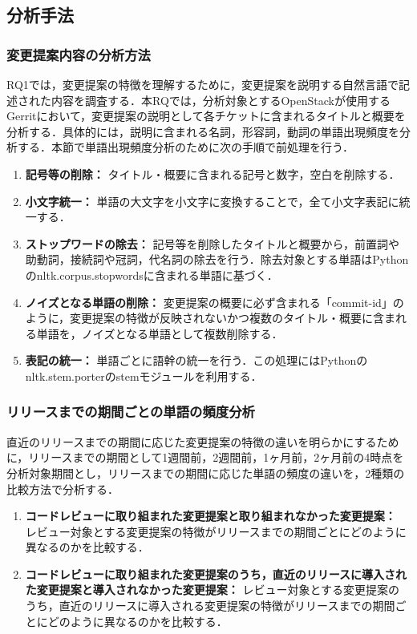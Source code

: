 \documentclass[T,J]{fose} %
\begin{document}
\subsection{分析手法}

\subsubsection{変更提案内容の分析方法}
RQ1では，変更提案の特徴を理解するために，変更提案を説明する自然言語で記述された内容を調査する．本RQでは，分析対象とするOpenStackが使用するGerritにおいて，変更提案の説明として各チケットに含まれるタイトルと概要を分析する．具体的には，説明に含まれる名詞，形容詞，動詞の単語出現頻度を分析する．本節で単語出現頻度分析のために次の手順で前処理を行う．

\begin{enumerate}
  \item{\textbf{記号等の削除：}}
  タイトル・概要に含まれる記号と数字，空白を削除する．
  \item{\textbf{小文字統一：}}
  単語の大文字を小文字に変換することで，全て小文字表記に統一する．
  \item{\textbf{ストップワードの除去：}}
  記号等を削除したタイトルと概要から，前置詞や助動詞，接続詞や冠詞，代名詞の除去を行う．除去対象とする単語はPythonのnltk.corpus.stopwordsに含まれる単語に基づく．
  \item{\textbf{ノイズとなる単語の削除：}}  
  変更提案の概要に必ず含まれる「commit-id」のように，変更提案の特徴が反映されないかつ複数のタイトル・概要に含まれる単語を，ノイズとなる単語として複数削除する．
  \item{\textbf{表記の統一：}}
  単語ごとに語幹の統一を行う．この処理にはPythonのnltk.stem.porterのstemモジュールを利用する．
\end{enumerate}

\subsubsection{リリースまでの期間ごとの単語の頻度分析}
直近のリリースまでの期間に応じた変更提案の特徴の違いを明らかにするために，リリースまでの期間として1週間前，2週間前，1ヶ月前，2ヶ月前の4時点を分析対象期間とし，リリースまでの期間に応じた単語の頻度の違いを，2種類の比較方法で分析する．

\begin{enumerate}
  \item{\textbf{コードレビューに取り組まれた変更提案と取り組まれなかった変更提案：}}
  レビュー対象とする変更提案の特徴がリリースまでの期間ごとにどのように異なるのかを比較する．
  \item{\textbf{コードレビューに取り組まれた変更提案のうち，直近のリリースに導入された変更提案と導入されなかった変更提案：}}
  レビュー対象とする変更提案のうち，直近のリリースに導入される変更提案の特徴がリリースまでの期間ごとにどのように異なるのかを比較する．
\end{enumerate}
\end{document}
